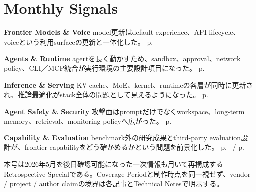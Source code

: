 \section*{Monthly Signals}
\smallskip
\noindent\textbf{Frontier Models \& Voice} model更新はdefault experience、API lifecycle、voiceという利用surfaceの更新と一体化した。 \hfill{\footnotesize p.~\pageref{pkg:frontier-models-may}}\par
\smallskip
\noindent\textbf{Agents \& Runtime} agentを長く動かすため、sandbox、approval、network policy、CLI／MCP統合が実行環境の主要設計項目になった。 \hfill{\footnotesize p.~\pageref{pkg:agents-runtime-may}}\par
\smallskip
\noindent\textbf{Inference \& Serving} KV cache、MoE、kernel、runtimeの各層が同時に更新され、推論最適化がstack全体の問題として見えるようになった。 \hfill{\footnotesize p.~\pageref{pkg:inference-serving-may}}\par
\smallskip
\noindent\textbf{Agent Safety \& Security} 攻撃面はpromptだけでなくworkspace、long-term memory、retrieval、monitoring policyへ広がった。 \hfill{\footnotesize p.~\pageref{pkg:agent-safety-security-may}}\par
\smallskip
\noindent\textbf{Capability \& Evaluation} benchmark外の研究成果とthird-party evaluation設計が、frontier capabilityをどう確かめるかという問題を前景化した。 \hfill{\footnotesize p.~\pageref{pkg:capability-evaluation-may} / p.~\pageref{pkg:paper-watch-may}}\par
\medskip
\begin{claimboundary}
本号は2026年5月を後日確認可能になった一次情報も用いて再構成するRetrospective Specialである。Coverage Periodと制作時点を同一視せず、vendor / project / author claimの境界は各記事とTechnical Notesで明示する。
\end{claimboundary}
\medskip
\tableofcontents

\medskip
